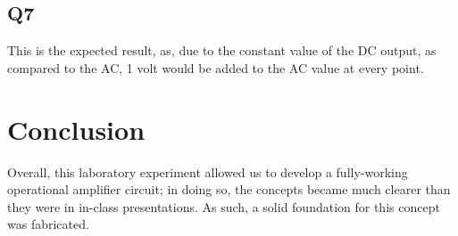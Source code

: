 \documentclass[
	letterpaper, %
	10pt, %
]{CSUniSchoolLabReport}
\begin{document}
\subsection{Q7} This is the expected result, as, due to the constant value of the DC output, as compared to the AC, 1 volt would be added to the AC value at every point.

\section{Conclusion}

Overall, this laboratory experiment allowed us to develop a fully-working operational amplifier circuit; in doing so, the concepts became much clearer than they were in in-class presentations. As such, a solid foundation for this concept was fabricated.
\end{document}
